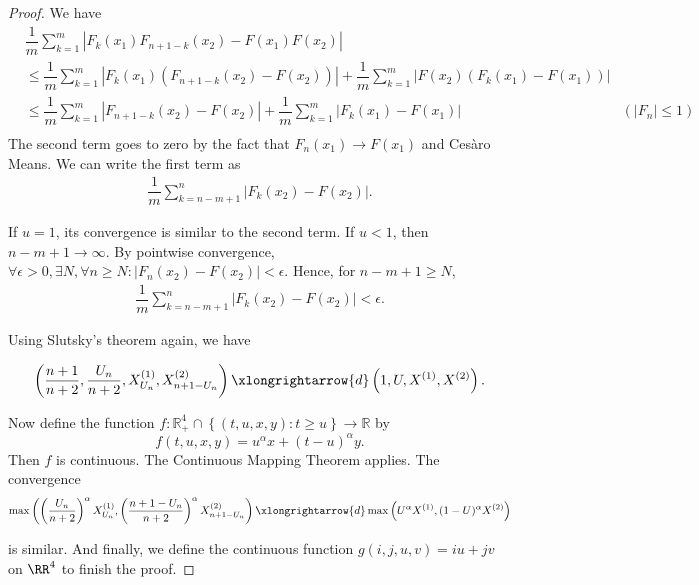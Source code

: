 \begin{proof}
  We have
  \begin{align*}
     & \dfrac{1}{m}\sum_{k=1}^{m} \left|F_k(x_1)F_{n+1-k}(x_2)-F(x_1) F(x_2)\right|                                                                                                       \\
     & \le \dfrac{1}{m}\sum_{k=1}^{m} \left|F_k(x_1)\left(F_{n+1-k}(x_2)-F(x_2)\right)\right| + \dfrac{1}{m}\sum_{k=1}^{m} \left|F(x_2)\left(F_k(x_1)-F(x_1)\right)\right|                \\
     & \le \dfrac{1}{m}\sum_{k=1}^{m} \left|F_{n+1-k}(x_2)-F(x_2)\right| + \dfrac{1}{m}\sum_{k=1}^{m} \left|F_k(x_1)-F(x_1)\right|                                         & (|F_n|\le 1) \\
  \end{align*}
  The second term goes to zero by the fact that $F_n(x_1)\to F(x_1)$ and Cesàro Means. We can write the first term as
  \begin{align*}
    \dfrac{1}{m}\sum_{k=n-m+1}^{n} \left|F_{k}(x_2)-F(x_2)\right|.
  \end{align*}

  If $u=1$, its convergence is similar to the second term. If $u<1$, then $n-m+1 \to \infty$. By pointwise convergence,$\forall \epsilon>0, \exists N, \forall n\ge N: |F_n(x_2)-F(x_2)|<\epsilon$. Hence, for $n-m+1\ge N$,
  \begin{align*}
    \dfrac{1}{m}\sum_{k=n-m+1}^{n} \left|F_{k}(x_2)-F(x_2)\right| < \epsilon.
  \end{align*}

  Using Slutsky's theorem again, we have

  $$\left(\dfrac{n+1}{n+2}, \dfrac{U_n}{n+2}, X_{U_n}^{(1)}, X_{n+1-U_n}^{(2)}\right) \xlongrightarrow{d} \left(1, U, X^{(1)}, X^{(2)}\right).$$

  Now define the function $f:\mathbb{R}^4_+\cap \left\{(t,u,x,y): t\ge u\right\} \to \mathbb{R}$ by
  $$f(t,u,x,y) = u^\alpha x + (t-u)^\alpha y.$$
  Then $f$ is continuous. The Continuous Mapping Theorem applies. The convergence
  $$\max\left(\left(\dfrac{U_n}{n+2}\right)^\alpha X_{U_n}^{(1)}, \left(\dfrac{n+1-U_n}{n+2}\right)^\alpha X_{n+1-U_n}^{(2)}\right) \xlongrightarrow{d} \max\left(U^\alpha X^{(1)}, (1-U)^\alpha X^{(2)}\right)$$

  is similar. And finally, we define the continuous function $g(i,j,u,v) = iu+jv$ on $\RR^4$ to finish the proof.


\end{proof}

